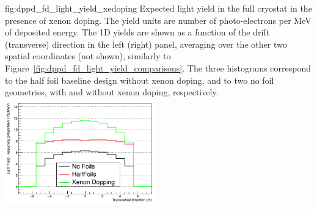 \begin{dunefigure}{fig:dppd_fd_light_yield_xedoping}
{Expected light yield in the full   cryostat in the presence of xenon doping. The yield units are number of photo-electrons per \si{\MeV} of deposited energy. The 1D yields are shown as a function of the drift (transverse) direction in the left (right) panel, averaging over the other two spatial coordinates (not shown), similarly to Figure~\ref{fig:dppd_fd_light_yield_comparisons}. The three histograms correspond to the half foil baseline design without xenon doping, and to two no foil geometries, with and without xenon doping, respectively.}
 \hfill
\includegraphics[width=0.49\textwidth]{graphics/dppd_xedoping_transverse.png}
\end{dunefigure}
